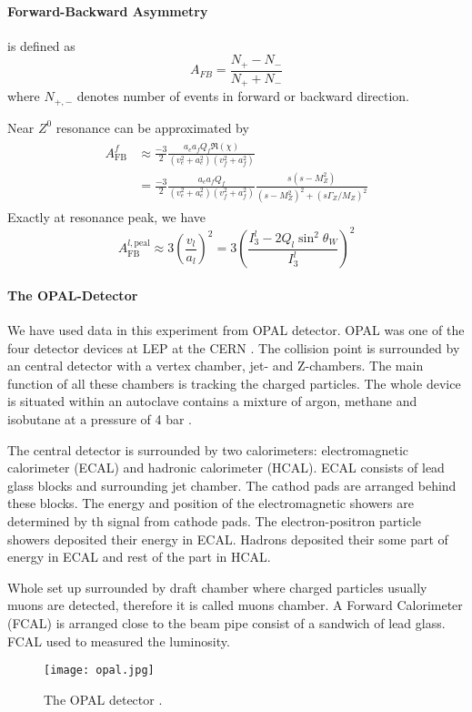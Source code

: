 \paragraph{Forward-Backward Asymmetry} is defined as 
\begin{equation}
	A_{FB} = \frac{N_+ - N_-}{N_+ + N_-}
	\label{math:AFBdef}
\end{equation}
where $N_{+,-}$ denotes number of events in forward or backward direction.

Near $Z^0$ resonance can be approximated by~\cite{manual}
\begin{align}
	\begin{split}
	A_\text{FB}^f &\approx \frac{-3}{2} \frac{a_e a_f Q_f \Re(\chi)}{(v_e^2 + a_e^2) (v_f^2 + a_f^2)} \\
	&=  \frac{-3}{2} \frac{a_e a_f Q_f }{(v_e^2 + a_e^2) (v_f^2 + a_f^2)} \frac{s(s-M_Z^2)}{(s-M_Z^2)^2 + (s \Gamma_Z / M_Z)^2 }
	\end{split}
	\label{math:AFBgen}
\end{align}
Exactly at resonance peak, we have
\begin{equation}
	A_\text{FB}^{l,\text{peal}} \approx 3 \left( \frac{v_l}{a_l} \right)^2 = 3 \left( \frac{I_3^l - 2 Q_l \sin^2\theta_W}{I_3^l} \right)^2
	\label{math:AFBpeak}
\end{equation}

\paragraph{The OPAL-Detector}
We have used data in this experiment from OPAL detector. OPAL was one of the four detector devices at LEP at the CERN \cite{manual}. The collision point is surrounded by an central detector with  a vertex chamber, jet- and Z-chambers. The main function of all these chambers is tracking the charged particles. The whole device is situated within an autoclave contains a mixture of argon, methane and isobutane at a pressure of 4 bar \cite{manual}.

The central detector is surrounded by two calorimeters: electromagnetic calorimeter (ECAL) and hadronic calorimeter (HCAL). ECAL consists of lead glass blocks and surrounding jet chamber. The cathod pads are arranged behind these blocks. The energy and position of the electromagnetic showers are determined by th signal from cathode pads. The electron-positron particle showers deposited their energy in ECAL. Hadrons deposited their some part of energy in ECAL and rest of the part in HCAL. 

Whole set up surrounded by draft chamber where charged particles usually muons are detected, therefore it is called muons chamber. A Forward Calorimeter (FCAL) is arranged close to the beam pipe consist of a sandwich of lead glass. FCAL used to measured the luminosity.


\begin{figure}[H]
	\centering
	\texttt{[image: opal.jpg]}
	\caption{ The OPAL detector \cite{manual}. }
	\label{fig:OPAL}
\end{figure}
